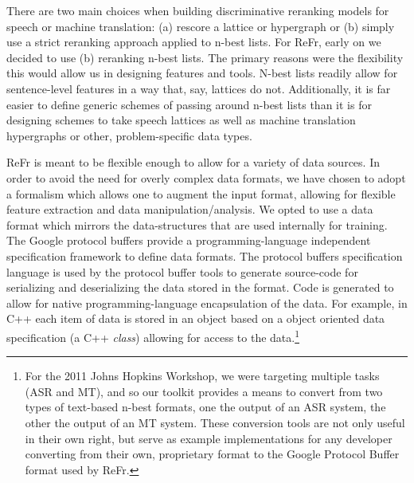 \documentclass[a4paper]{article}
\begin{document}
There are two main choices when building discriminative reranking
models for speech or machine translation: (a) rescore a lattice or
hypergraph or (b) simply use a strict reranking approach applied to
n-best lists. For ReFr, early on we decided to use (b) reranking
n-best lists. The primary reasons were the flexibility this would
allow us in designing features and tools. N-best lists readily allow for
sentence-level features in a way that, say, lattices do not.
Additionally, it is far easier to define generic schemes of passing around
n-best lists than it is for designing schemes to take speech lattices as well
as machine translation hypergraphs or other, problem-specific data types.




ReFr is meant to be flexible enough to allow
for a variety of data sources. In order to avoid the need for overly complex data formats, we have
chosen to adopt a formalism which allows one to augment the input
format, allowing for flexible feature extraction and data manipulation/analysis.
We opted to use a data format which mirrors the data-structures that
are used internally for training. The Google protocol buffers\cite{protobuf}
provide a programming-language independent specification framework
to define data formats. The protocol buffers specification language
is used by the protocol buffer tools to generate source-code for serializing
and deserializing the data stored in the format. Code is generated
to allow for native programming-language encapsulation of the data.
For example, in C++ each item of data is stored in an object based
on a object oriented data specification (a C++ \emph{class}) allowing
for access to the data.\footnote{For the 2011 Johns Hopkins Workshop, we were targeting multiple tasks (ASR and MT), and so our toolkit provides a means to convert from two types of text-based n-best formats, one the output of an ASR system, the other the output of an MT system.  These conversion tools are not only useful in their own right, but serve as example implementations for any developer converting from their own, proprietary format to the Google Protocol Buffer format used by ReFr.}
\end{document}

